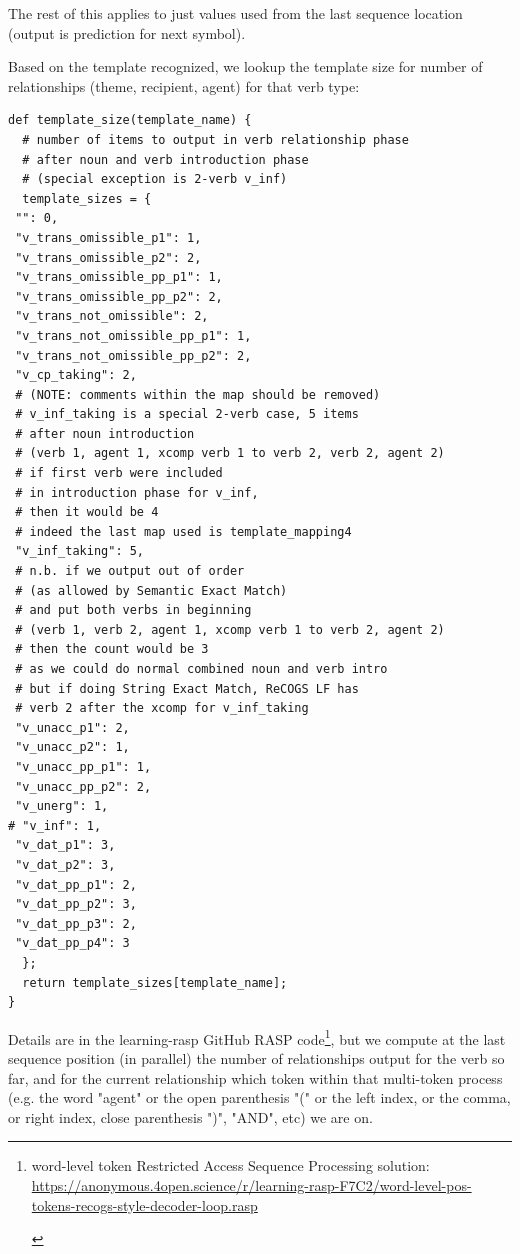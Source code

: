 \documentclass[11pt]{article}
\begin{document}
The rest of this applies to just values used from the last sequence location (output is prediction for next symbol).

Based on the template recognized, we lookup the template size for number of relationships (theme, recipient, agent) for that verb type:
\begin{tiny}
\begin{verbatim}
def template_size(template_name) {
  # number of items to output in verb relationship phase
  # after noun and verb introduction phase
  # (special exception is 2-verb v_inf)
  template_sizes = {
 "": 0,
 "v_trans_omissible_p1": 1,
 "v_trans_omissible_p2": 2,
 "v_trans_omissible_pp_p1": 1,
 "v_trans_omissible_pp_p2": 2,
 "v_trans_not_omissible": 2,
 "v_trans_not_omissible_pp_p1": 1,
 "v_trans_not_omissible_pp_p2": 2,
 "v_cp_taking": 2,
 # (NOTE: comments within the map should be removed)
 # v_inf_taking is a special 2-verb case, 5 items
 # after noun introduction
 # (verb 1, agent 1, xcomp verb 1 to verb 2, verb 2, agent 2)
 # if first verb were included 
 # in introduction phase for v_inf,
 # then it would be 4
 # indeed the last map used is template_mapping4
 "v_inf_taking": 5,
 # n.b. if we output out of order
 # (as allowed by Semantic Exact Match)
 # and put both verbs in beginning
 # (verb 1, verb 2, agent 1, xcomp verb 1 to verb 2, agent 2)
 # then the count would be 3
 # as we could do normal combined noun and verb intro
 # but if doing String Exact Match, ReCOGS LF has
 # verb 2 after the xcomp for v_inf_taking
 "v_unacc_p1": 2,
 "v_unacc_p2": 1,
 "v_unacc_pp_p1": 1,
 "v_unacc_pp_p2": 2,
 "v_unerg": 1,
# "v_inf": 1,
 "v_dat_p1": 3,
 "v_dat_p2": 3,
 "v_dat_pp_p1": 2,
 "v_dat_pp_p2": 3,
 "v_dat_pp_p3": 2,
 "v_dat_pp_p4": 3
  };
  return template_sizes[template_name];
}
\end{verbatim}
\end{tiny}

Details are in the learning-rasp GitHub RASP code\footnote{\begin{footnotesize}word-level token Restricted Access Sequence Processing solution: \href{https://anonymous.4open.science/r/learning-rasp-F7C2/word-level-pos-tokens-recogs-style-decoder-loop.rasp}{https://anonymous.4open.science/r/learning-rasp-F7C2/word-level-pos-tokens-recogs-style-decoder-loop.rasp} \end{footnotesize}}, but we compute at the last sequence position (in parallel) the number of relationships output for the verb so far, and for the current relationship which token within that multi-token process (e.g. the word "agent" or the open parenthesis "(" or the left index, or the comma, or right index, close parenthesis ")", "AND", etc) we are on.
\end{document}
